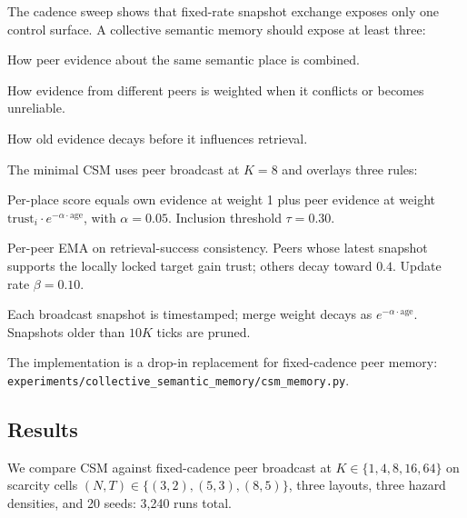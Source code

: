 \documentclass{article}
\newcommand{\method}[1]{\texttt{#1}}
\begin{document}
The cadence sweep shows that fixed-rate snapshot exchange exposes only
one control surface. A collective semantic memory should expose at
least three:
\begin{description}[leftmargin=14pt,itemsep=1pt,topsep=2pt]
\item[Merge.] How peer evidence about the same semantic place is combined.
\item[Trust.] How evidence from different peers is weighted when it conflicts or becomes unreliable.
\item[Staleness.] How old evidence decays before it influences retrieval.
\end{description}

The minimal CSM uses peer broadcast at $K{=}8$ and overlays three
rules:
\begin{description}[leftmargin=14pt,itemsep=1pt,topsep=2pt]
\item[\textit{Merge.}] Per-place score equals own evidence at weight 1 plus peer evidence at weight $\mathrm{trust}_i \cdot e^{-\alpha \cdot \mathrm{age}}$, with $\alpha=0.05$. Inclusion threshold $\tau=0.30$.
\item[\textit{Trust.}] Per-peer EMA on retrieval-success consistency. Peers whose latest snapshot supports the locally locked target gain trust; others decay toward $0.4$. Update rate $\beta=0.10$.
\item[\textit{Staleness.}] Each broadcast snapshot is timestamped; merge weight decays as $e^{-\alpha\cdot\mathrm{age}}$. Snapshots older than $10K$ ticks are pruned.
\end{description}

The implementation is a drop-in replacement for fixed-cadence peer
memory: \method{experiments/collective\_semantic\_memory/csm\_memory.py}.

\subsection{Results}

We compare CSM against fixed-cadence peer broadcast at
$K \in \{1,4,8,16,64\}$ on scarcity cells
$(N,T){\in}\{(3,2),(5,3),(8,5)\}$, three layouts, three hazard
densities, and 20 seeds: 3{,}240 runs total.
\end{document}
